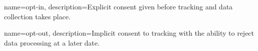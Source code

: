 {   
    name={opt-in},
    description={Explicit consent given before tracking and data collection takes place.}
}

{   
    name={opt-out},
    description={Implicit consent to tracking with the ability to reject data processing at a later date.}
}

